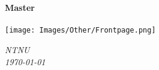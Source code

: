 \begin{titlepage}
\begin{center}
~\\[1cm]
\HRule \\[0.2cm]
{\huge \bfseries Master \\[0.2cm] }
\HRule \\\vspace{1cm}
\texttt{[image: Images/Other/Frontpage.png]}\\[\baselineskip]
\par
\Large
\par
{\itshape NTNU\\\today\par}
\end{center}
\end{titlepage}